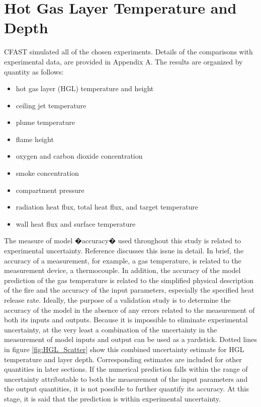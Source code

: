 \chapter{Hot Gas Layer Temperature and Depth}

CFAST simulated all of the chosen experiments.  Details of the comparisons with experimental data, are provided in Appendix A.  The results are organized by quantity as follows:

\begin{itemize}
\item hot gas layer (HGL) temperature and height
\item ceiling jet temperature
\item plume temperature 
\item flame height
\item oxygen and carbon dioxide concentration
\item smoke concentration
\item compartment pressure
\item radiation heat flux, total heat flux, and target temperature
\item wall heat flux and surface temperature
\end{itemize}

The measure of model �accuracy� used throughout this study is related to experimental uncertainty. Reference \cite{NRCNUREG1824Experimental}  discusses this issue in detail. In brief, the accuracy of a measurement, for example, a gas temperature, is related to the measurement device, a thermocouple. In addition, the accuracy of the model prediction of the gas temperature is related to the simplified physical description of the fire and the accuracy of the input parameters, especially the specified heat release rate. Ideally, the purpose of a validation study is to determine the accuracy of the model in the absence of any errors related to the measurement of both its inputs and outputs. Because it is impossible to eliminate experimental uncertainty, at the very least a combination of the uncertainty in the measurement of model inputs and output can be used as a yardstick. Dotted lines in figure \ref{fig:HGL_Scatter}  show this combined uncertainty estimate for HGL temperature and layer depth. Corresponding estimates are included for other quantities in later sections. If the numerical prediction falls within the range of uncertainty attributable to both the measurement of the input parameters and the output quantities, it is not possible to further quantify its accuracy. At this stage, it is said that the prediction is within experimental uncertainty.

